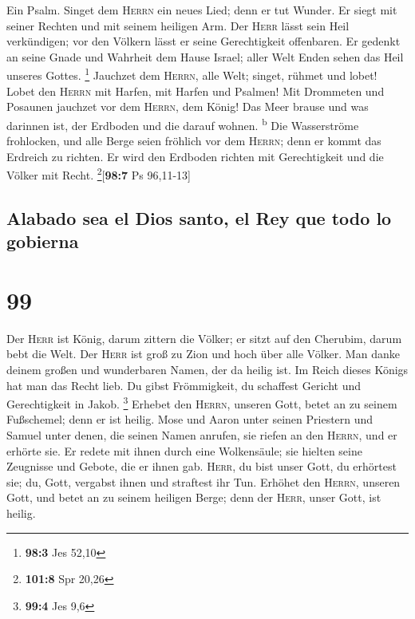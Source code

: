  Ein Psalm. Singet dem \textsc{Herrn} ein neues Lied; denn
er tut Wunder. Er siegt mit seiner Rechten und mit seinem heiligen Arm.
 Der \textsc{Herr} lässt sein Heil verkündigen; vor den
Völkern lässt er seine Gerechtigkeit offenbaren.  Er
gedenkt an seine Gnade und Wahrheit dem Hause Israel; aller Welt Enden
sehen das Heil unseres Gottes. \footnote{\textbf{98:3} Jes 52,10}
 Jauchzet dem \textsc{Herrn}, alle Welt; singet, rühmet
und lobet!  Lobet den \textsc{Herrn} mit Harfen, mit
Harfen und Psalmen!  Mit Drommeten und Posaunen jauchzet
vor dem \textsc{Herrn}, dem König!  Das Meer brause und
was darinnen ist, der Erdboden und die darauf wohnen.
\textsuperscript{b}  Die Wasserströme frohlocken, und alle
Berge seien fröhlich  vor dem \textsc{Herrn}; denn er
kommt das Erdreich zu richten. Er wird den Erdboden richten mit
Gerechtigkeit und die Völker mit Recht. \footnote{\textbf{101:8} Spr
  20,26}{[}\textbf{98:7} Ps 96,11-13{]}

\hypertarget{alabado-sea-el-dios-santo-el-rey-que-todo-lo-gobierna}{%
\subsection{Alabado sea el Dios santo, el Rey que todo lo
gobierna}\label{alabado-sea-el-dios-santo-el-rey-que-todo-lo-gobierna}}

\hypertarget{section-98}{%
\section{99}\label{section-98}}

 Der \textsc{Herr} ist König, darum zittern die Völker; er
sitzt auf den Cherubim, darum bebt die Welt.  Der
\textsc{Herr} ist groß zu Zion und hoch über alle Völker. 
Man danke deinem großen und wunderbaren Namen, der da heilig ist.
 Im Reich dieses Königs hat man das Recht lieb. Du gibst
Frömmigkeit, du schaffest Gericht und Gerechtigkeit in Jakob.
\footnote{\textbf{99:4} Jes 9,6}  Erhebet den
\textsc{Herrn}, unseren Gott, betet an zu seinem Fußschemel; denn er ist
heilig.  Mose und Aaron unter seinen Priestern und Samuel
unter denen, die seinen Namen anrufen, sie riefen an den \textsc{Herrn},
und er erhörte sie.  Er redete mit ihnen durch eine
Wolkensäule; sie hielten seine Zeugnisse und Gebote, die er ihnen gab.
 \textsc{Herr}, du bist unser Gott, du erhörtest sie; du,
Gott, vergabst ihnen und straftest ihr Tun.  Erhöhet den
\textsc{Herrn}, unseren Gott, und betet an zu seinem heiligen Berge;
denn der \textsc{Herr}, unser Gott, ist heilig.

